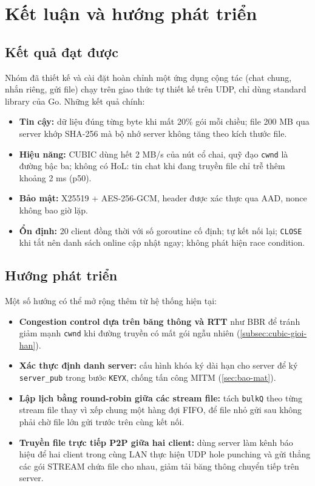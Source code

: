 \section{Kết luận và hướng phát triển}
\label{sec:ket-luan}

\subsection{Kết quả đạt được}
Nhóm đã thiết kế và cài đặt hoàn chỉnh một ứng dụng cộng tác (chat chung, nhắn riêng, gửi file) chạy trên giao
thức tự thiết kế trên UDP, chỉ dùng standard library của Go. Những kết quả chính:
\begin{itemize}
  \item \textbf{Tin cậy:} dữ liệu đúng từng byte khi mất 20\% gói mỗi chiều; file 200 MB qua server khớp SHA-256
        mà bộ nhớ server không tăng theo kích thước file.
  \item \textbf{Hiệu năng:} CUBIC dùng hết 2 MB/s của nút cổ chai, quỹ đạo \texttt{cwnd} là đường bậc ba; không
        có HoL: tin chat khi đang truyền file chỉ trễ thêm khoảng 2 ms (p50).
  \item \textbf{Bảo mật:} X25519 + AES-256-GCM, header được xác thực qua AAD, nonce không bao giờ lặp.
  \item \textbf{Ổn định:} 20 client đồng thời với số goroutine cố định; tự kết nối lại; \texttt{CLOSE} khi tắt nên
        danh sách online cập nhật ngay;  không phát hiện race condition.
\end{itemize}

\subsection{Hướng phát triển}
Một số hướng có thể mở rộng thêm từ hệ thống hiện tại:
\begin{itemize}
  \item \textbf{Congestion control dựa trên băng thông và RTT} như BBR \cite{bbr} để tránh giảm mạnh \texttt{cwnd}
        khi đường truyền có mất gói ngẫu nhiên (\cref{subsec:cubic-gioi-han}).
  \item \textbf{Xác thực định danh server:} cấu hình khóa ký dài hạn cho server để ký \texttt{server\_pub} trong
        bước \texttt{KEYX}, chống tấn công MITM (\cref{sec:bao-mat}).
  \item \textbf{Lập lịch bằng round-robin giữa các stream file:} tách \texttt{bulkQ} theo từng stream file
        thay vì xếp chung một hàng đợi FIFO, để file nhỏ gửi sau không phải chờ file lớn gửi trước trên cùng kết nối.
  \item \textbf{Truyền file trực tiếp P2P giữa hai client:} dùng server làm kênh báo hiệu để hai client trong cùng
        LAN thực hiện UDP hole punching và gửi thẳng các gói STREAM chứa file cho nhau, giảm tải băng thông chuyển
        tiếp trên server.
\end{itemize}
